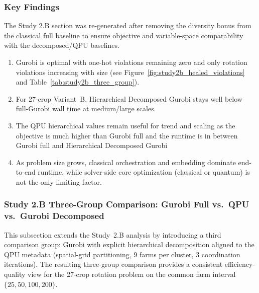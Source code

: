 \subsubsection{Key Findings}

The Study 2.B section was re-generated after removing the diversity bonus from the
classical full baseline to ensure objective and variable-space comparability with
the decomposed/QPU baselines.

\begin{enumerate}[label=\textbf{Result \arabic*.}, leftmargin=*, align=left, itemsep=1em]


\item 
Gurobi is optimal with one-hot violations remaining zero and only
rotation violations increasing with size (see Figure~\ref{fig:study2b_healed_violations}
and Table~\ref{tab:study2b_three_group}).

\item

For 27-crop Variant~B, Hierarchical Decomposed Gurobi stays well below full-Gurobi wall time at medium/large scales.

\item

The QPU hierarchical values remain useful for trend and scaling as the objective is much higher than Gurobi full and the runtime is in between Gurobi full and Hierarchical Decomposed Gurobi

\item

As problem size grows,
classical orchestration and embedding dominate end-to-end runtime, while solver-side
core optimization (classical or quantum) is not the only limiting factor.

\end{enumerate}


\subsubsection{Study 2.B Three-Group Comparison: Gurobi Full vs.\ QPU vs.\ Gurobi Decomposed}
\label{subsec:study2b_three_group}

This subsection extends the Study~2.B analysis by introducing a third comparison group:
Gurobi with explicit hierarchical decomposition aligned to the QPU metadata
(spatial-grid partitioning, 9 farms per cluster, 3 coordination iterations).
The resulting three-group comparison provides a consistent efficiency-quality
view for the 27-crop rotation problem on the common farm interval
$\{25, 50, 100, 200\}$.

